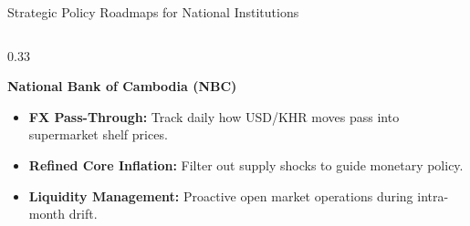 \documentclass[aspectratio=169, 10pt]{beamer}
\begin{document}
\begin{frame}{Strategic Policy Roadmaps for National Institutions}
\begin{columns}
    \begin{column}{0.33\textwidth}
      \begin{alertblock}{\centering \textbf{National Bank of Cambodia (NBC)}}
        \small
        \begin{itemize}
          \item \textbf{FX Pass-Through:} Track daily how USD/KHR moves pass into supermarket shelf prices.
          \item \textbf{Refined Core Inflation:} Filter out supply shocks to guide monetary policy.
          \item \textbf{Liquidity Management:} Proactive open market operations during intra-month drift.
        \end{itemize}
      \end{alertblock}
    \end{column}
  \end{columns}
\end{frame}
\end{document}
